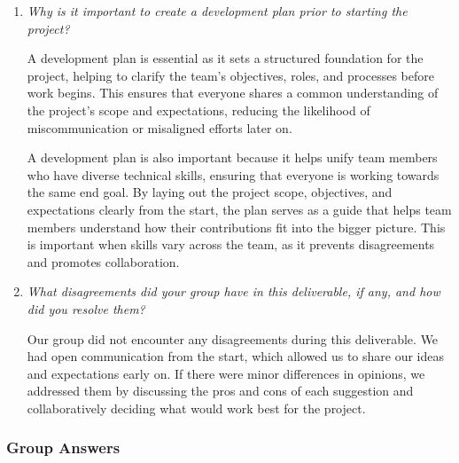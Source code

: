 \documentclass{article}
\begin{document}
\begin{enumerate}
  \item \textit{Why is it important to create a development plan
    prior to starting the project?}

    A development plan is essential as it sets a structured
    foundation for the project, helping to
    clarify the team's objectives, roles, and processes before work
    begins. This ensures that everyone
    shares a common understanding of the project's scope and
    expectations, reducing the likelihood
    of miscommunication or misaligned efforts later on.

    A development plan is also important because it helps unify team
    members who have diverse technical
    skills, ensuring that everyone is working towards the same end
    goal. By laying out the project scope,
    objectives, and expectations clearly from the start, the plan
    serves as a guide that helps team
    members understand how their contributions fit into the bigger
    picture. This is important when
    skills vary across the team, as it prevents disagreements and
    promotes collaboration.

  \item \textit{What disagreements did your group have in this
    deliverable, if any, and how did you resolve them?}

    Our group did not encounter any disagreements during this
    deliverable. We had open communication from
    the start, which allowed us to share our ideas and expectations
    early on. If there were minor differences
    in opinions, we addressed them by discussing the pros and cons of
    each suggestion and collaboratively
    deciding what would work best for the project.

\end{enumerate}

\subsubsection*{Group Answers}
\end{document}
